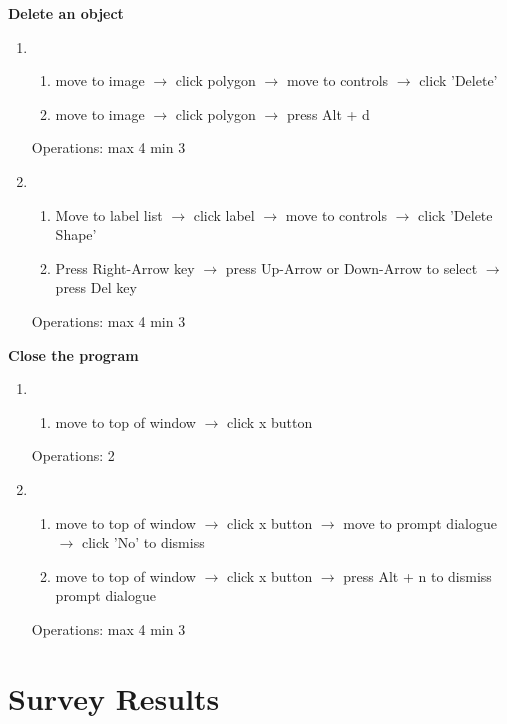 \documentclass[a4paper,11pt,oneside]{article}
\begin{document}
{\bf Delete an object}
\begin{enumerate}
    \item
    \begin{enumerate}
        \item move to image $\rightarrow$ click polygon $\rightarrow$ move to controls $\rightarrow$ click 'Delete'
        \item move to image $\rightarrow$ click polygon $\rightarrow$ press Alt + d
    \end{enumerate}
    Operations: max 4 min 3
    \item
    \begin{enumerate}
        \item Move to label list $\rightarrow$ click label $\rightarrow$ move to controls $\rightarrow$ click 'Delete Shape'
        \item Press Right-Arrow key $\rightarrow$ press Up-Arrow or Down-Arrow to select $\rightarrow$ press Del key
    \end{enumerate}
    Operations: max 4 min 3
\end{enumerate}

{\bf Close the program}
\begin{enumerate}
    \item
    \begin{enumerate}
        \item move to top of window $\rightarrow$ click x button
    \end{enumerate}
    Operations: 2
    \item
    \begin{enumerate}
        \item move to top of window $\rightarrow$ click x button $\rightarrow$ move to prompt dialogue $\rightarrow$ click 'No' to dismiss
        \item move to top of window $\rightarrow$ click x button $\rightarrow$ press Alt + n to dismiss prompt dialogue
    \end{enumerate}
    Operations: max 4 min 3
\end{enumerate}

\section{Survey Results}
\label{sec:survey}
\end{document}
